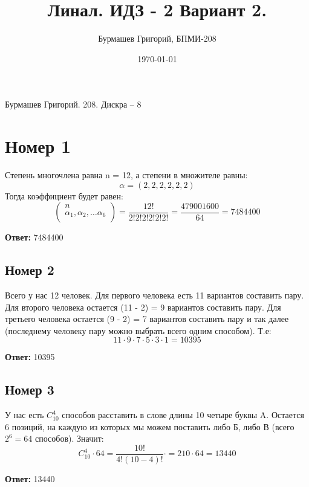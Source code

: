 \documentclass[a4paper,12pt]{article}
\author{Бурмашев Григорий, БПМИ-208}
\title{Линал. ИДЗ - 2 Вариант 2.}
\date{\today}
\begin{document}
\begin{center}
Бурмашев Григорий. 208. Дискра -- 8
\end{center}
\section*{Номер 1}
Степень многочлена равна n = 12, а степени в множителе равны:
\[
\alpha = (2, 2, 2, 2, 2, 2)
\]
Тогда коэффициент будет равен:
\[
\begin{pmatrix}
n \\
\alpha_1, \alpha_2, \ldots \alpha_6 \\ 
\end{pmatrix} = \frac{12!}{2!2!2!2!2!2!} = \frac{479001600}{64}  = 7484400
\]
\begin{center}
\textbf{Ответ:} 7484400
\end{center}

\subsection*{Номер 2}
Всего у нас 12 человек. Для первого человека есть 11 вариантов составить пару. Для второго человека остается (11 - 2) = 9  вариантов составить пару. Для третьего человека остается (9  - 2) = 7 вариантов составить пару и так далее (последнему человеку пару можно выбрать всего одним способом). Т.е:
\[
11 \cdot 9 \cdot 7 \cdot 5 \cdot 3 \cdot 1 = 10395
\]
\begin{center}
\textbf{Ответ:} 10395
\end{center}

\subsection*{Номер 3}
У нас есть $C_{10}^4$ способов расставить в слове длины 10 четыре буквы A. Остается 6 позиций, на каждую из которых мы можем поставить либо Б, либо В (всего $2^6 = 64$ способов). Значит:
\[
C_{10}^4 \cdot 64 = \frac{10!}{4!(10-4)!} \cdot = 210 \cdot 64 = 13440
\]
\begin{center}
\textbf{Ответ:} 13440
\end{center}

\newpage
\end{document}
